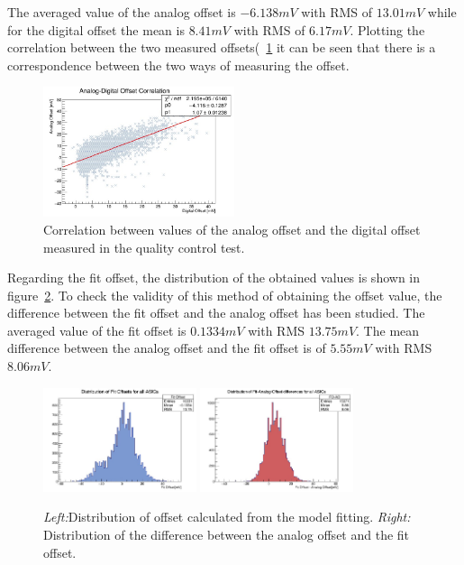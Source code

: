 \documentclass[a4paper,10pt]{book}
\begin{document}
The averaged value of the analog offset is $-6.138 mV$ with RMS of $13.01 mV$ while for the digital offset the mean is $8.41mV$ with RMS of $6.17 mV$. Plotting the correlation between the two measured offsets(~\ref{fig:offsetcor} it can
be seen that there is a correspondence between the two ways of measuring the offset.

\begin{figure}
\centering
 \includegraphics[width=0.5\textwidth]{./offsetscor.jpg}
  \caption{Correlation between values of the analog offset and the digital offset measured in the quality control test.}
    \label{fig:offsetcor}
\end{figure}

Regarding the fit offset, the distribution of the obtained values is shown in figure~\ref{fig:fitoffdist}. To check the validity of this method of obtaining the offset value, the difference between the fit offset and
the analog offset has been studied.  The averaged value of the fit offset is $0.1334 mV$ with RMS $13.75 mV$. The mean difference between the analog offset and the fit offset is of $5.55 mV$ with RMS $8.06 mV$.
\\
\begin{figure}
\centering
 \includegraphics[width=0.4\textwidth]{./fitoffsetdist.jpg}
  \includegraphics[width=0.4\textwidth]{./diffoffsetdif.jpg}
  \caption{\textit{Left:}Distribution of offset calculated from the model fitting. \textit{Right:} Distribution of the difference between the analog offset and the fit offset.}
    \label{fig:fitoffdist}
\end{figure}
\end{document}
